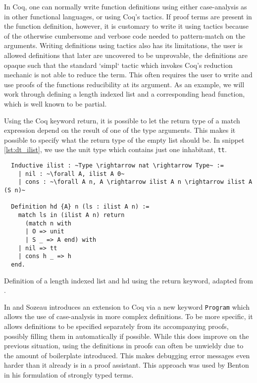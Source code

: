 \documentclass[a4, 12pt, final]{article}
\begin{document}
In Coq, one can normally write function definitions using either case-analysis as in other functional languages, or using Coq's tactics.
If proof terms are present in the function definition, however, it is customary to write it using tactics because of the otherwise cumbersome and verbose code needed to pattern-match on the arguments.
Writing definitions using tactics also has its limitations, the user is allowed definitions that later are uncovered to be unprovable, the definitions are opaque such that the standard `simpl` tactic which invokes Coq's reduction mechanic is not able to reduce the term.
This often requires the user to write and use proofs of the functions reducibility at its argument.
As an example, we will work through defining a length indexed list and a corresponding head function, which is well known to be partial.

Using the Coq keyword return, it is possible to let the return type of a match expression depend on the result of one of the type arguments.
This makes it possible to specify what the return type of the empty list should be.
In snippet \ref{lst:dt_ilist}, we use the unit type which contains just one inhabitant, \texttt{tt}.

\begin{listing}
  \begin{verbatim}
  Inductive ilist : ~Type \rightarrow nat \rightarrow Type~ :=
    | nil : ~\forall A, ilist A 0~
    | cons : ~\forall A n, A \rightarrow ilist A n \rightarrow ilist A (S n)~

  Definition hd {A} n (ls : ilist A n) :=
    match ls in (ilist A n) return
      (match n with
      | O => unit
      | S _ => A end) with
    | nil => tt
    | cons h _ => h
  end.
  \end{verbatim}
  \caption{Definition of a length indexed list and hd using the return keyword, adapted from \cite{ChlipalaCPDT}.}
  \label{lst:dt_ilist}
\end{listing}

In \cite{Sozeau2006} and \cite{Sozeau2007} Sozeau introduces an extension to Coq via a new keyword \texttt{Program} which allows the use of case-analysis in more complex definitions.
To be more specific, it allows definitions to be specified separately from its accompanying proofs, possibly filling them in automatically if possible.
While this does improve on the previous situation, using the definitions in proofs can often be unwieldy due to the amount of boilerplate introduced.
This makes debugging error messages even harder than it already is in a proof assistant. This approach was used by Benton in his formulation of strongly typed terms.
\end{document}
